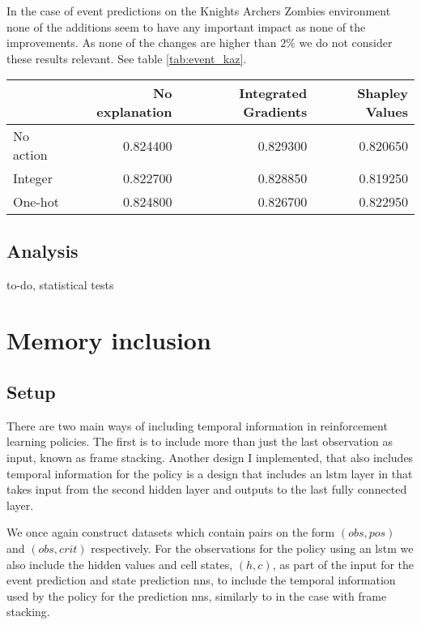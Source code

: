 \documentclass[UKenglish]{uiomasterthesis}
\begin{document}
In the case of event predictions on the Knights Archers Zombies environment none of the additions seem to have any important impact as none of the improvements. As none of the changes are higher than $2\%$ we do not consider these results relevant. See table \ref{tab:event_kaz}.

\begin{center}
\label{tab:event_kaz}
\begin{tabular}{lrrr}
\toprule
 & No explanation & Integrated Gradients & Shapley Values \\
\midrule
No action & 0.824400 & 0.829300 & 0.820650 \\
Integer & 0.822700 & 0.828850 & 0.819250 \\
One-hot & 0.824800 & 0.826700 & 0.822950 \\
\bottomrule
\end{tabular}
\end{center}

\subsection{Analysis}
to-do, statistical tests

\section{Memory inclusion}

\subsection{Setup}

There are two main ways of including temporal information in reinforcement learning policies. The first is to include more than just the last observation as input, known as frame stacking. Another design I implemented, that also includes temporal information for the policy is a design that includes an \ac{lstm} layer in that takes input from the second hidden layer and outputs to the last fully connected layer.

We once again construct datasets which contain pairs on the form $(obs, pos)$ and $(obs, crit)$ respectively. For the observations for the policy using an \ac{lstm} we also include the hidden values and cell states, $(h,c)$, as part of the input for the event prediction and state prediction \acp{nn}, to include the temporal information used by the policy for the prediction \acp{nn}, similarly to in the case with frame stacking.
\end{document}
